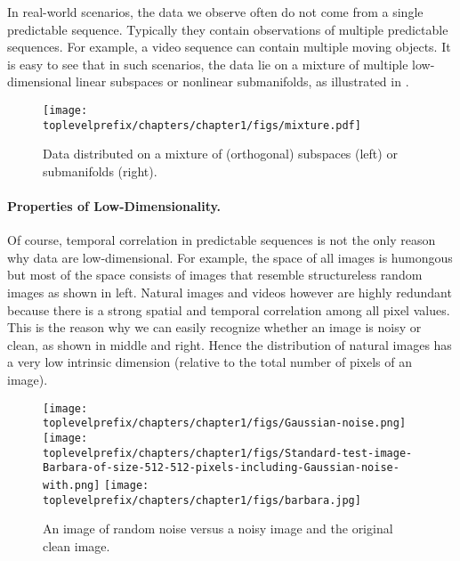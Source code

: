 \documentclass[../../book-main.tex]{subfiles}
\begin{document}
In real-world scenarios, the data we observe often do not come from a single predictable sequence. Typically they contain observations of multiple predictable sequences. For example, a video sequence can contain multiple moving objects. It is easy to see that in such scenarios, the data lie on a mixture of multiple low-dimensional linear subspaces or nonlinear submanifolds, as illustrated in . 
\begin{figure}
    \centering
    \texttt{[image: \\toplevelprefix/chapters/chapter1/figs/mixture.pdf]}
    \caption{Data distributed on a mixture of (orthogonal) subspaces (left) or submanifolds (right).}
    \label{fig:mixture-models}
\end{figure}


\paragraph{Properties of Low-Dimensionality.}
Of course, temporal correlation in predictable sequences is not the only reason why data are low-dimensional. For example, the space of all images is humongous but most of the space consists of images that resemble structureless random images as shown in  left. Natural images and videos however are highly redundant because there is a strong spatial and temporal correlation among all pixel values. This is the reason why we can easily recognize whether an image is noisy or clean, as shown in  middle and right. Hence the distribution of natural images has a very low intrinsic dimension (relative to the total number of pixels of an image).

\begin{figure}
    \centering
    \texttt{[image: \\toplevelprefix/chapters/chapter1/figs/Gaussian-noise.png]}\hspace{2mm} 
    \texttt{[image: \\toplevelprefix/chapters/chapter1/figs/Standard-test-image-Barbara-of-size-512-512-pixels-including-Gaussian-noise-with.png]} \hspace{2mm} 
    \texttt{[image: \\toplevelprefix/chapters/chapter1/figs/barbara.jpg]}
    \caption{An image of random noise versus a noisy image and the original clean image. %
    }
    \label{fig:noise-image}
\end{figure}
\end{document}
